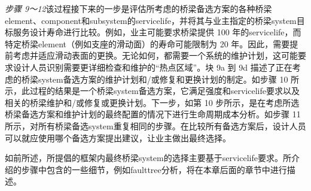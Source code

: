 \emph{步骤 9～12}\quad 该过程接下来的一步是评估所考虑的桥梁备选方案的各种桥梁\gls*{element}、\gls*{component}和\gls*{subsystem}的\gls*{servicelife}，并将其与业主指定的桥梁\gls*{system}目标服务设计寿命进行比较。例如，业主可能要求桥梁提供 100 年的\gls*{servicelife}，而特定桥梁\gls*{element}（例如支座的滑动面）的寿命可能限制为 20 年。因此，需要提前考虑并适应滑动表面的更换。无论如何，都需要一个系统的维护计划，这可能要求设计人员识别需要更详细检查和维护的“热点区域”。块 9a 到 9d 描述了正在考虑的桥梁\gls*{system}备选方案的维护计划和/或修复和更换计划的制定。如步骤 10 所示，此过程的结果是一个桥梁\gls*{system}备选方案，它满足强度和\gls*{servicelife}要求以及相关的桥梁维护和/或修复或更换计划。下一步，如第 10 步所示，是在考虑所选桥梁备选方案和维护计划的最终配置的情况下进行生命周期成本分析。如步骤 11 所示，对所有桥梁备选\gls*{system}重复相同的步骤。在比较所有备选方案后，设计人员可以就应使用哪个备选方案提出建议，让业主做出最终选择。

如前所述，所提倡的框架内最终桥梁\gls*{system}的选择主要基于\gls*{servicelife}要求。所介绍的步骤中包含的一些细节，例如\gls*{faulttree}分析，将在本章后面的章节中进行描述。

